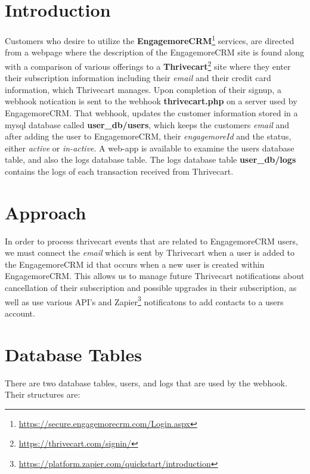 \documentclass[final,letterpaper,12pt]{article}
\begin{document}
\section{Introduction}
\noindent Customers who desire to utilize the {\bf EngagemoreCRM}\footnote{\url{https://secure.engagemorecrm.com/Login.aspx}} services, are directed from a webpage
where the description of the EngagemoreCRM site is found along with a comparison of various offerings
to a {\bf Thrivecart}\footnote{\url{https://thrivecart.com/signin/}} site where they enter their subscription information including their {\it email} and their credit card information, which Thrivecart manages.
Upon completion of their signup, a webhook notication is sent to the webhook {\bf thrivecart.php} on
a server used by EngagemoreCRM.  That webhook, updates the customer information stored in a mysql
database called {\bf user\_db/users}, which keeps the customers {\it email} and after adding the user to EngagemoreCRM,
their {\it engagemoreId} and the status, either {\it active} or {\it in-active}.  A web-app is available to examine the users database table, and also
the logs database table. The logs database table {\bf user\_db/logs} contains the logs of each transaction received
from Thrivecart.


\section{Approach}
\noindent In order to process thrivecart events that are related to EngagemoreCRM users, we must connect
the {\it email} which is sent by Thrivecart when a user is added to the EngagemoreCRM  id that
occurs when a new user is created within EngagemoreCRM.  This allows us to manage future Thrivecart
notifications about cancellation of their subscription and possible upgrades in their subscription, as well as use various API's and Zapier\footnote{\url{https://platform.zapier.com/quickstart/introduction}} notificatons to add contacts to a users account.

\newpage
\section{Database Tables}
\noindent There are two database tables, users, and logs that are used by the webhook.  Their structures are:
\smallskip
\end{document}
